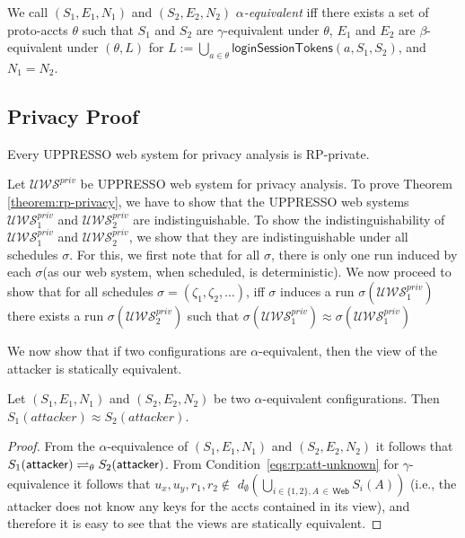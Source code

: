   \begin{definition}
    We call $(S_1,E_1,N_1)$ and $(S_2,E_2,N_2)$
    \emph{$\alpha$-equivalent} iff there exists a set of 
    proto-accts $\theta$ such that $S_1$ and $S_2$ are
    $\gamma$-equivalent under $\theta$, $E_1$ and $E_2$ are
    $\beta$-equivalent under $(\theta,L)$ 
    for $L := \bigcup_{a\in\theta} \mathsf{loginSessionTokens}(a,S_1,S_2)$, 
    and $N_1 = N_2$.
  \end{definition}
  
  \subsection{Privacy Proof}
  
  \begin{theorem} \label{theorem:rp-privacy}
    Every UPPRESSO web system for privacy analysis is RP-private.
  \end{theorem}
  
  Let $\mathcal{U\!W\!S}^{priv}$ be UPPRESSO web system for privacy analysis.
  To prove Theorem \ref{theorem:rp-privacy}, we have to show that 
  the UPPRESSO web systems $\mathcal{U\!W\!S}^{priv}_1$ and 
  $\mathcal{U\!W\!S}^{priv}_2$ are indistinguishable. To show 
  the indistinguishability of $\mathcal{U\!W\!S}^{priv}_1$ and 
  $\mathcal{U\!W\!S}^{priv}_2$, we show that they are 
  indistinguishable under all schedules $\sigma$. For this, 
  we first note that for all $\sigma$, there is only one run 
  induced by each $\sigma$(as our web system, when scheduled, is deterministic).
  We now proceed to show that for all schedules $\sigma=(\zeta _1, \zeta_2,\dots)$, 
  iff $\sigma$ induces a run $\sigma(\mathcal{U\!W\!S}^{priv}_1)$ 
  there exists a run $\sigma(\mathcal{U\!W\!S}^{priv}_2)$ 
  such that $\sigma(\mathcal{U\!W\!S}^{priv}_1)\approx\sigma(\mathcal{U\!W\!S}^{priv}_1)$
  
  We now show that if two configurations are $\alpha$-equivalent, 
  then the view of the attacker is statically equivalent.
  
  \begin{lemma}
    Let $(S_1,E_1,N_1)$ and $(S_2,E_2,N_2)$ be two 
    $\alpha$-equivalent configurations. 
    Then $S_1(attacker)\approx S_2(attacker)$.
  \end{lemma}
  \begin{proof}
    From the $\alpha$-equivalence of $(S_1,E_1,N_1)$ and 
    $(S_2,E_2,N_2)$ it follows that $S_1(\mathsf{attacker}) 
    \rightleftharpoons_{\theta} S_2(\mathsf{attacker})$.
    From Condition~\ref{eqs:rp:att-unknown} for 
    $\gamma$-equivalence it follows that
    $u_x, u_y, r_1, r_2 \not\in $
    $d_\emptyset(\bigcup_{i\in\{1,2\},A\,\in\,\mathsf{Web}}S_i(A))$ 
    (i.e., the attacker does not know any keys for the accts 
    contained in its view), and therefore it is easy to see 
    that the views are statically equivalent.
  \end{proof}
  

